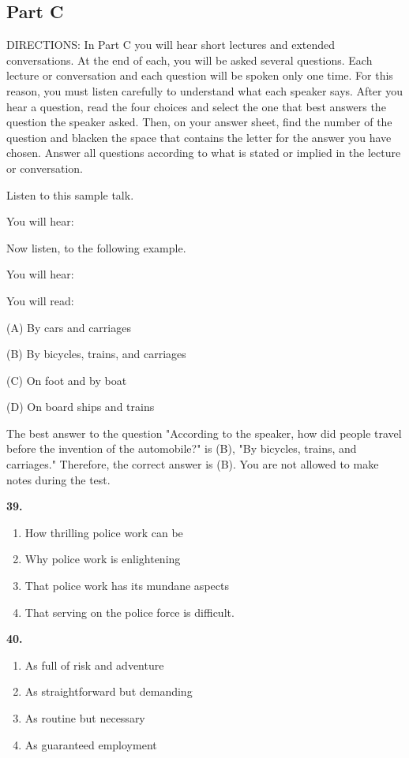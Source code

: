 \documentclass[12pt]{article}
\begin{document}
\subsection*{Part C}
DIRECTIONS: In Part C you will hear short lectures and extended conversations. At the end of each, you will be asked several questions. Each lecture or conversation and each question will be spoken only one time. For this reason, you must listen carefully to understand what each speaker says. After you hear a question, read the four choices and select the one that best answers the question the speaker asked. Then, on your answer sheet, find the number of the question and blacken the space that contains the letter for the answer you have chosen. Answer all questions according to what is stated or implied in the lecture or conversation.\par
\begin{exampleblock}
Listen to this sample talk.\par
You will hear:\par
Now listen, to the following example.\par
You will hear:\par
You will read:\par
(A) By cars and carriages\par
(B) By bicycles, trains, and carriages\par
(C) On foot and by boat\par
(D) On board ships and trains\par
The best answer to the question "According to the speaker, how did people travel before the invention of the automobile?" is (B), "By bicycles, trains, and carriages." Therefore, the correct answer is (B). You are not allowed to make notes during the test.\par
\end{exampleblock}
\noindent\textbf{39.}
\begin{enumerate}[label=(\Alph*),leftmargin=*,itemsep=0.2em]
\item How thrilling police work can be
\item Why police work is enlightening
\item That police work has its mundane aspects
\item That serving on the police force is difficult.
\end{enumerate}
\par
\vspace{0.25\baselineskip}
\noindent\textbf{40.}
\begin{enumerate}[label=(\Alph*),leftmargin=*,itemsep=0.2em]
\item As full of risk and adventure
\item As straightforward but demanding
\item As routine but necessary
\item As guaranteed employment
\end{enumerate}
\end{document}
